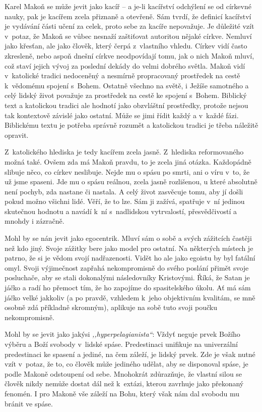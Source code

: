 Karel Makoň se může jevit jako kacíř -- a je-li kacířství odchýlení se od
církevné nauky, pak je kacířem zcela přiznaně a otevřeně. Sám tvrdí, že definicí
kacířství je vydávání části učení za celek, proto sebe za kacíře nepovažuje. Je
důležité vzít v~potaz, že Makoň se vůbec nesnaží zaštiťovat autoritou nějaké
církve. Nemluví jako křesťan, ale jako člověk, který čerpá z~vlastního vhledu.
Církev vidí často zkresleně, nebo aspoň dnešní církve neodpovídají tomu, jak o
nich Makoň mluví, což staví jejich vývoj za poslední dekády do velmi dobrého
světla. Makoň vidí v~katolické tradici nedoceněný a nesmírně propracovaný
prostředek na cestě k~vědomému spojení s~Bohem. Ostatně všechno na světě, i
Ježíše samotného a celý lidský život považuje za prostředek na cestě ke spojení
s~Bohem. Biblický text a katolickou tradici ale hodnotí jako obzvláštní
prostředky, protože nejsou tak kontextově závislé jako ostatní. Může se jimi
řídit každý a v~každé fázi. Biblickému textu je potřeba správně rozumět a
katolickou tradici je třeba náležitě opravit.

Z~katolického hlediska je tedy kacířem zcela jasně. Z~hlediska reformovaného
možná také. Ovšem zda má Makoň pravdu, to je zcela jiná otázka. Každopádně
slibuje něco, co církev neslibuje. Nejde mu o spásu po smrti, ani o víru v~to,
že už jsme spaseni. Jde mu o spásu reálnou, zcela jasně rozlišenou, u které
absolutně není pochyb, zda nastane či nastala. A celý život zasvěcuje tomu, aby
jí došli pokud možno všichni lidé. Věří, že to lze. Sám ji zažívá, spatřuje v~ní
jedinou skutečnou hodnotu a navádí k~ní s~nadlidskou vytrvalostí, přesvědčivostí
a mnohdy i zázračně.

Mohl by se nán jevit jako egocentrik. Mluví sám o sobě a svých zážitcích častěji
než kdo jiný. Svoje zážitky bere jako model pro ostatní. Na některých místech je
patrno, že si je vědom svojí nadřazenosti. Vidět ho ale jako egoistu by byl
fatální omyl. Svoji výjimečnost zapřahá nekompromisně do svého poslání přimět
svoje posluchače, aby se stali dokonalými následovníky Kristovými. Říká, že
Satan je jáčko a radí ho přemoct tím, že ho zapojíme do spasitelského úkolu. Ať
má sám jáčko velké jakkoliv (a po pravdě, vzhledem k~jeho objektivním kvalitám,
se mně osobně zdá příkladně skromným), aplikuje na sobě tuto svoji poučku
nekompromisně.

Mohl by se jevit jako jakýsi \textit{,,hyperpelagianista``}: Vždyť neguje prvek
Božího výběru a Boží svobody v~lidské spáse. Predestinaci unifikuje na
univerzální predestinaci ke spasení a jediné, na čem záleží, je lidský prvek.
Zde je však nutné vzít v~potaz, že to, co člověk může jediného udělat, aby se
disponoval spáse, je podle Makoně odstoupení od sebe. Mnohokrát zdůrazňuje, že
vlastní silou se člověk nikdy nemůže dostat dál než k~extázi, kterou zavrhuje
jako překonaný fenomén. I pro Makoně vše záleží na Bohu, který však nám dal
svobodu mu bránit ve spáse.


